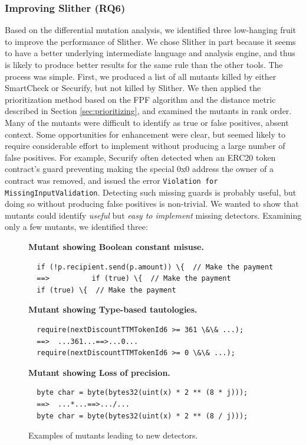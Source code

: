 \subsubsection{Improving Slither {\bf (RQ6)}}

Based on the differential mutation analysis, we identified three low-hanging fruit to improve the performance of Slither.  We chose Slither in part because it seems to have a better underlying intermediate language and analysis engine, and thus is likely to produce better results for the same rule than the other tools.  The process was simple.  First, we produced a list of all mutants killed by either SmartCheck or Securify, but not killed by Slither.  We then applied the prioritization method based on the FPF algorithm and the distance metric described in Section \ref{sec:prioritizing}, and examined the mutants in rank order.  Many of the mutants were difficult to identify as true or false positives, absent context.  Some opportunities for enhancement were clear, but seemed likely to require considerable effort to implement without producing a large number of false positives.  For example, Securify often detected when an ERC20 token contract's guard preventing making the special 0x0 address the owner of a contract was removed, and issued the error {\tt Violation for MissingInputValidation}. Detecting such missing guards is probably useful, but doing so without producing false positives is non-trivial.  We wanted to show that mutants could identify \emph{useful} but \emph{easy to implement} missing detectors.  Examining only a few mutants, we identified three:

\begin{figure}
  {\scriptsize
      {\bf Mutant showing Boolean constant misuse.}

    
\noindent
\begin{verbatim}
  if (!p.recipient.send(p.amount)) \{  // Make the payment
  ==>          if (true) \{  // Make the payment
  if (true) \{  // Make the payment
\end{verbatim}
}

 {\scriptsize
 {\bf Mutant showing Type-based tautologies.}
\begin{verbatim}
  require(nextDiscountTTMTokenId6 >= 361 \&\& ...);
  ==>  ...361...==>...0...
  require(nextDiscountTTMTokenId6 >= 0 \&\& ...);
\end{verbatim}
}


      {\scriptsize
      {\bf Mutant showing Loss of precision.}        
\begin{verbatim}
  byte char = byte(bytes32(uint(x) * 2 ** (8 * j)));
  ==>  ...*...==>.../...
  byte char = byte(bytes32(uint(x) * 2 ** (8 / j)));
\end{verbatim}
}
        \caption{Examples of mutants leading to new detectors.}
       \label{fig:newdetect}
    \end{figure}

